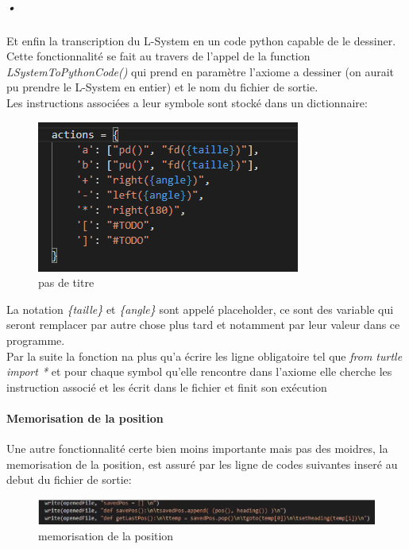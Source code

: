 \documentclass{report}
\begin{document}
				\subparagraph{•}
				Et enfin la transcription du L-System en un code python capable de le dessiner. Cette fonctionnalité se fait au travers de l'appel de la function \emph{LSystemToPythonCode()} qui prend en paramètre l'axiome a dessiner (on aurait pu prendre le L-System en entier) et le nom du fichier de sortie. \\
				
				Les instructions associées a leur symbole sont stocké dans un dictionnaire:
				
				\begin{figure}[h]
					\begin{center}
						\includegraphics[scale=0.70]{images/action_switcher.PNG}
						\caption{pas de titre}
					\end{center}
				\end{figure}
			
				La notation \emph{\{taille\}} et \emph{\{angle\}} sont appelé placeholder, ce sont des variable qui seront remplacer par autre chose plus tard et notamment par leur valeur dans ce programme. \\
			
				Par la suite la fonction na plus qu'a écrire les ligne obligatoire tel que \emph{from turtle import *} et pour chaque symbol qu'elle rencontre dans l'axiome elle cherche les instruction associé et les écrit dans le fichier et finit son exécution

			\paragraph{Memorisation de la position} Une autre fonctionnalité certe bien moins importante mais pas des moidres, la memorisation de la position, est assuré par les ligne de codes suivantes inseré au debut du fichier de sortie: 

			\begin{figure}[h]
				\begin{center}
					\includegraphics[scale=0.85]{images/position_memorisation.PNG}
					\caption{memorisation de la position}
				\end{center}
			\end{figure}
				
\end{document}

